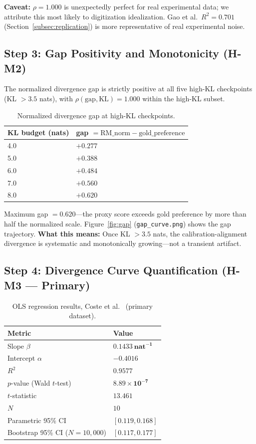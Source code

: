 \textbf{Caveat:} $\rho = 1.000$ is unexpectedly perfect for real experimental data; we attribute this most likely to digitization idealization. Gao et al.\ $R^2 = 0.701$ (Section~\ref{subsec:replication}) is more representative of real experimental noise.

\subsection{Step 3: Gap Positivity and Monotonicity (H-M2)}

The normalized divergence gap is strictly positive at all five high-KL checkpoints (KL $> 3.5$ nats), with $\rho(\text{gap}, \text{KL}) = 1.000$ within the high-KL subset.

\begin{table}[h]
\centering
\caption{Normalized divergence gap at high-KL checkpoints.}
\label{tab:gap}
\begin{tabular}{ll}
\toprule
KL budget (nats) & gap $= \text{RM\_norm} - \text{gold\_preference}$ \\
\midrule
4.0 & $+0.277$ \\
5.0 & $+0.388$ \\
6.0 & $+0.484$ \\
7.0 & $+0.560$ \\
8.0 & $\mathbf{+0.620}$ \\
\bottomrule
\end{tabular}
\end{table}

Maximum gap $= 0.620$---the proxy score exceeds gold preference by more than half the normalized scale. Figure~\ref{fig:gap} (\texttt{gap\_curve.png}) shows the gap trajectory. \textbf{What this means:} Once KL $> 3.5$ nats, the calibration-alignment divergence is systematic and monotonically growing---not a transient artifact.

\subsection{Step 4: Divergence Curve Quantification (H-M3 --- Primary)}

\begin{table}[h]
\centering
\caption{OLS regression results, Coste et al.~\cite{Coste2023Reward} (primary dataset).}
\label{tab:regression_coste}
\begin{tabular}{ll}
\toprule
Metric & Value \\
\midrule
Slope $\beta$ & $\mathbf{0.1433\ \text{nat}^{-1}}$ \\
Intercept $\alpha$ & $-0.4016$ \\
$R^2$ & $\mathbf{0.9577}$ \\
$p$-value (Wald $t$-test) & $\mathbf{8.89 \times 10^{-7}}$ \\
$t$-statistic & $13.461$ \\
$N$ & $10$ \\
Parametric 95\% CI & $[0.119, 0.168]$ \\
Bootstrap 95\% CI ($N=10{,}000$) & $[0.117, 0.177]$ \\
\bottomrule
\end{tabular}
\end{table}

